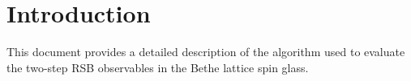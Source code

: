 \chapter{Introduction}

This document provides a detailed description of the algorithm used to evaluate the two-step RSB observables in the Bethe lattice spin glass. 